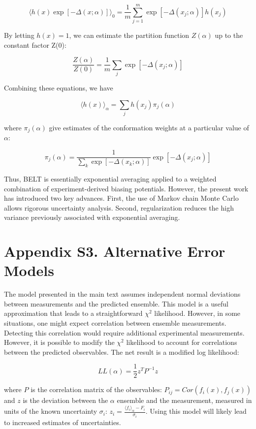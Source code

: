 \documentclass[12pt]{article}
\begin{document}
$$\langle h(x) \exp[-\Delta(x;\alpha)]\rangle _0 = \frac{1}{m} \sum_{j = 1}^{m} \exp [ - \Delta(x_j;\alpha)] h(x_j)$$

By letting $h(x) = 1$, we can estimate the partition function $Z(\alpha)$ up to the constant factor Z(0):

$$ \frac{Z(\alpha)}{Z(0)} = \frac{1}{m} \sum_j \exp[-\Delta(x_j;\alpha)]$$

Combining these equations, we have

$$\langle h(x)\rangle _\alpha = \sum_j h(x_j) \pi_j(\alpha)$$

where $\pi_j(\alpha)$ give estimates of the conformation weights at a particular value of $\alpha$:

$$\pi_j(\alpha) = \frac{1}{\sum_k \exp[-\Delta(x_k;\alpha)]} \exp[-\Delta(x_j;\alpha)]$$

Thus, BELT is essentially exponential averaging applied to a weighted combination of experiment-derived biasing potentials.  However, the present work has introduced two key advances.  First, the use of Markov chain Monte Carlo allows rigorous uncertainty analysis.  Second, regularization reduces the high variance previously associated with exponential averaging.  

\newpage

\section*{Appendix S3.  Alternative Error Models}

The model presented in the main text assumes independent normal deviations between measurements and the predicted ensemble.  This model is a useful approximation that leads to a straightforward $\chi^2$ likelihood.  However, in some situations, one might expect correlation between ensemble measurements.  Detecting this correlation would require additional experimental measurements.  However, it is possible to modify the $\chi^2$ likelihood to account for correlations between the predicted observables.  The net result is a modified log likelihood:

$$L L(\alpha) = \frac{1}{2} z^T P^{-1} z$$

where $P$ is the correlation matrix of the observables: $P_{ij} = Cor(f_i(x), f_j(x))$ and $z$ is the deviation between the $\alpha$ ensemble and the measurement, measured in units of the known uncertainty $\sigma_i$: $z_i = \frac{\langle f_i\rangle _\alpha - F_i}{\sigma_i}$.  Using this model will likely lead to increased estimates of uncertainties.  
\end{document}
